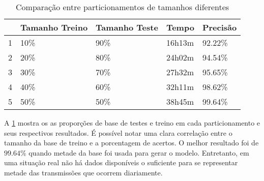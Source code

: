 \begin{table}[h]
    \centering
    \caption{Comparação entre particionamentos de tamanhos diferentes}
    \label{tab:partic}
    \begin{tabular}{l|l|l|l|l|}
        \cline{2-5}
                                                        & \multicolumn{1}{c|}{\cellcolor[HTML]{EFEFEF}Tamanho Treino} & \multicolumn{1}{c|}{\cellcolor[HTML]{EFEFEF}Tamanho Teste} & \multicolumn{1}{c|}{\cellcolor[HTML]{EFEFEF}Tempo} & \multicolumn{1}{c|}{\cellcolor[HTML]{EFEFEF}Precisão} \\ \hline
        \multicolumn{1}{|l|}{\cellcolor[HTML]{EFEFEF}1} & 10\%                                                        & 90\%                                                       & 16h13m                                             & 92.22\%                                               \\ \hline
        \multicolumn{1}{|l|}{\cellcolor[HTML]{EFEFEF}2} & 20\%                                                        & 80\%                                                       & 24h02m                                             & 94.54\%                                               \\ \hline
        \multicolumn{1}{|l|}{\cellcolor[HTML]{EFEFEF}3} & 30\%                                                        & 70\%                                                       & 27h32m                                             & 95.65\%                                               \\ \hline
        \multicolumn{1}{|l|}{\cellcolor[HTML]{EFEFEF}4} & 40\%                                                        & 60\%                                                       & 32h11m                                             & 98.62\%                                               \\ \hline
        \multicolumn{1}{|l|}{\cellcolor[HTML]{EFEFEF}5} & 50\%                                                        & 50\%                                                       & 38h45m                                             & 99.64\%                                               \\ \hline
    \end{tabular}
\end{table}

\par A \ref{tab:partic} mostra os as proporções de base de testes e treino em cada particionamento e seus respectivos
resultados. É possível notar uma clara correlação entre o tamanho da base de treino e a porcentagem de acertos. O
melhor resultado foi de $99.64$\% quando metade da base foi usada para gerar o modelo. Entretanto, em uma situação real
não há dados disponíveis o suficiente para se representar metade das transmissões que ocorrem diariamente.


